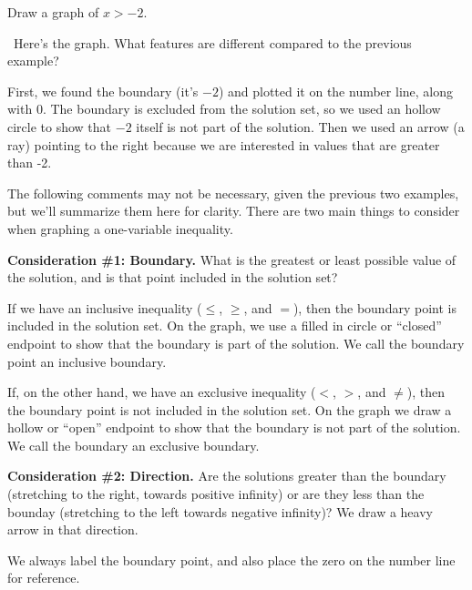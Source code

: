 \begin{boxex}
Draw a graph of $x > -2$.

\exsoln\ Here's the graph. What features are different compared to the previous example?

\begin{center}
\end{center}

First, we found the boundary (it's $-2$) and plotted it on the number line, along with 0. The boundary is excluded from the solution set, so we used an hollow circle to show that $-2$ itself is not part of the solution. Then we used an arrow (a ray) pointing to the right because we are interested in values that are greater than -2.
\end{boxex}

The following comments may not be necessary, given the previous two examples, but we'll summarize them here for clarity. There are two main things to consider when graphing a one-variable inequality.

\textbf{Consideration \#1: Boundary.} What is the greatest or least possible value of the solution, and is that point included in the solution set?

If we have an inclusive inequality ($\leq$, $\geq$, and $=$), then the boundary point is included in the solution set. On the graph, we use a filled in circle or ``closed'' endpoint to show that the boundary is part of the solution. We call the boundary point an \gls{inclusive boundary}.

If, on the other hand, we have an exclusive inequality ($<$, $>$, and $\neq$), then the boundary point is not included in the solution set. On the graph we draw a hollow or ``open'' endpoint to show that the boundary is not part of the solution. We call the boundary an \gls{exclusive boundary}.

\textbf{Consideration \#2: Direction.} Are the solutions greater than the boundary (stretching to the right, towards positive infinity) or are they less than the bounday (stretching to the left towards negative infinity)? We draw a heavy arrow in that direction.

We always label the boundary point, and also place the zero on the number line for reference.

